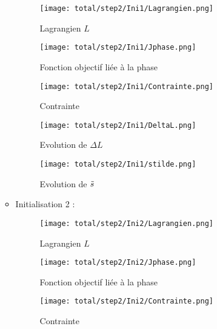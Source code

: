 \documentclass[11pt,a4paper]{article}
\begin{document}
\begin{itemize}
\begin{itemize}
		\begin{figure}[H]
			\begin{minipage}{0.33\textwidth}
				\centering
				\texttt{[image: total/step2/Ini1/Lagrangien.png]}
				\caption{Lagrangien $L$}
			\end{minipage}
			\begin{minipage}{0.33\textwidth}
				\centering
				\texttt{[image: total/step2/Ini1/Jphase.png]}
				\caption{Fonction objectif liée à la phase}
			\end{minipage}
			\begin{minipage}{0.33\textwidth}
				\centering
				\texttt{[image: total/step2/Ini1/Contrainte.png]}
				\caption{Contrainte}
			\end{minipage}
		\end{figure}
		
		\begin{figure}[H]
			\begin{minipage}{0.45\textwidth}
				\centering
				\texttt{[image: total/step2/Ini1/DeltaL.png]}
				\caption{Evolution de $\Delta L$}
			\end{minipage}
			\begin{minipage}{0.45\textwidth}
				\centering
				\texttt{[image: total/step2/Ini1/stilde.png]}
				\caption{Evolution de $\tilde{s}$}
			\end{minipage}
		\end{figure}
		
		\item Initialisation 2 :
		
		\begin{figure}[H]
			\begin{minipage}{0.33\textwidth}
				\centering
				\texttt{[image: total/step2/Ini2/Lagrangien.png]}
				\caption{Lagrangien $L$}
			\end{minipage}
			\begin{minipage}{0.33\textwidth}
				\centering
				\texttt{[image: total/step2/Ini2/Jphase.png]}
				\caption{Fonction objectif liée à la phase}
			\end{minipage}
			\begin{minipage}{0.33\textwidth}
				\centering
				\texttt{[image: total/step2/Ini2/Contrainte.png]}
				\caption{Contrainte}
			\end{minipage}
		\end{figure}
		

\end{itemize}
\end{itemize}
\end{document}
